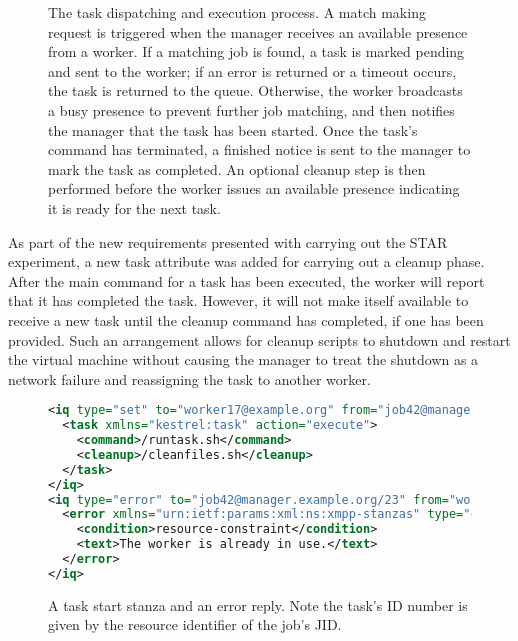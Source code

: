%
\begin{figure}

\caption{\label{fig:Task-dispatching}The task dispatching and execution process.
A match making request is triggered when the manager receives an available
presence from a worker. If a matching job is found, a task is marked
pending and sent to the worker; if an error is returned or a timeout
occurs, the task is returned to the queue. Otherwise, the worker broadcasts
a busy presence to prevent further job matching, and then notifies
the manager that the task has been started. Once the task's command
has terminated, a finished notice is sent to the manager to mark the
task as completed. An optional cleanup step is then performed before
the worker issues an available presence indicating it is ready for
the next task.}

\end{figure}


As part of the new requirements presented with carrying out the STAR
experiment, a new task attribute was added for carrying out a cleanup
phase. After the main command for a task has been executed, the worker
will report that it has completed the task. However, it will not make
itself available to receive a new task until the cleanup command has
completed, if one has been provided. Such an arrangement allows for
cleanup scripts to shutdown and restart the virtual machine without
causing the manager to treat the shutdown as a network failure and
reassigning the task to another worker.

%
\begin{figure}
\begin{lstlisting}[language=XML,tabsize=4]
<iq type="set" to="worker17@example.org" from="job42@manager.example.org/23">
  <task xmlns="kestrel:task" action="execute"> 
    <command>/runtask.sh</command> 
    <cleanup>/cleanfiles.sh</cleanup>
  </task> 
</iq>
<iq type="error" to="job42@manager.example.org/23" from="worker17@example.org">
  <error xmlns="urn:ietf:params:xml:ns:xmpp-stanzas" type="cancel"> 
    <condition>resource-constraint</condition> 
    <text>The worker is already in use.</text> 
  </error> 
</iq>
\end{lstlisting}
\caption{\label{fig:Task-Stanza} A task start stanza and an error reply. Note
the task's ID number is given by the resource identifier of the job's
JID. }

\end{figure}



